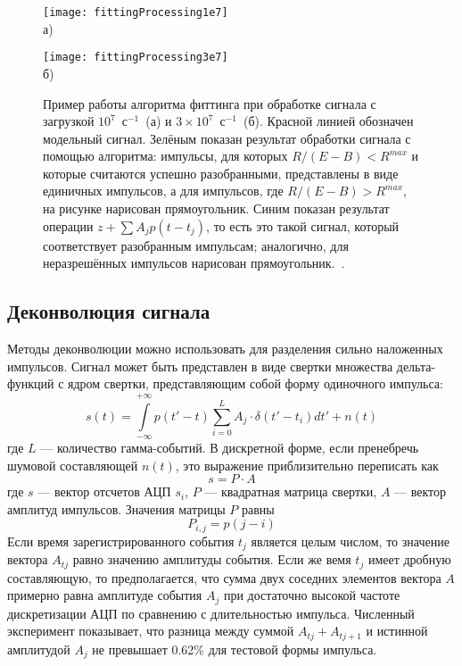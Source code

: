 \begin{figure}[ht]
    \begin{minipage}[b][][b]{0.95\linewidth}\centering
        \texttt{[image: fittingProcessing1e7]} \\ а)
    \end{minipage}
    \vfill
    \begin{minipage}[b][][b]{0.95\linewidth}\centering
        \texttt{[image: fittingProcessing3e7]} \\ б)
    \end{minipage}
    \vspace{5mm}
    \caption{ Пример работы алгоритма фиттинга при обработке сигнала с загрузкой $10^7$~с${}^{-1}$~(а) и $3 \times 10^7$~с${}^{-1}$~(б). Красной линией обозначен модельный сигнал. Зелёным показан результат обработки сигнала с помощью алгоритма: импульсы, для которых $R/(E-B)<R^{max}$ и которые считаются успешно разобранными, представлены в виде единичных импульсов, а для импульсов, где $R/(E-B)>R^{max}$, на рисунке нарисован прямоугольник. Синим показан результат операции $z + \sum A_j p(t - t_j)$, то есть это такой сигнал, который соответствует разобранным импульсам; аналогично, для неразрешённых импульсов нарисован прямоугольник.~\cite{Khilkevitch2020}. }
    \label{fig:FittingProcessing}
\end{figure}



\subsection{Деконволюция сигнала}

Методы деконволюции можно использовать для разделения сильно наложенных импульсов. Сигнал может быть представлен в виде свертки множества дельта-функций с ядром свертки, представляющим собой форму одиночного импульса: 
\begin{equation}
  \label{eq:SignalAsConvolution}
  s(t) = \int \limits_{-\infty}^{+\infty} p( t' - t ) \sum \limits_{i=0}^{L} A_j \cdot \delta(t' - t_i) dt' + n(t)
\end{equation}
где $L$ --- количество гамма-событий. В дискретной форме, если пренебречь шумовой составляющей $n(t)$, это выражение приблизительно переписать как 
\begin{equation}
  s = P \cdot A
\end{equation}
где $s$ --- вектор отсчетов АЦП $s_i$, $P$ --- квадратная матрица свертки, $A$ --- вектор амплитуд импульсов. Значения матрицы $P$ равны
\begin{equation*}
  P_{i,j} = p( j - i )
\end{equation*}
Если время зарегистрированного события $t_j$ является целым числом, то значение вектора $A_{tj}$ равно значению амплитуды события. Если же вемя $t_j$ имеет дробную составляющую, то предполагается, что сумма двух соседних элементов вектора $A$ примерно равна амплитуде события $A_j$ при достаточно высокой частоте дискретизации АЦП по сравнению с длительностью импульса. Численный эксперимент показывает, что разница между суммой $A_{tj} + A_{tj+1}$ и истинной амплитудой $A_j$ не превышает 0.62\% для тестовой формы импульса.

